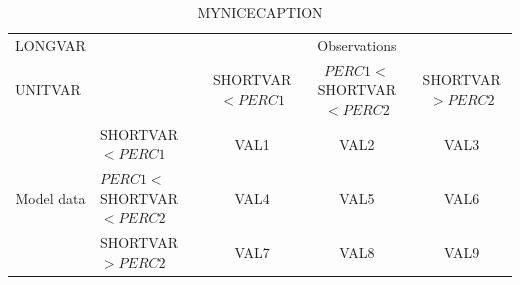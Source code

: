 
\begin{table}[p!]
\begin{center}
\begin{tabular}{llccc}
\hline
{LONGVAR}                                       &                                                    & \multicolumn{3}{c}{Observations}                 \\
{UNITVAR}                                       &                             & SHORTVAR$<PERC1$   & $PERC1<$SHORTVAR$<PERC2$ & SHORTVAR$>PERC2$ \\
\hline
\multicolumn{1}{c}{\multirow{3}{*}{Model data}}  & SHORTVAR$<PERC1$          & VAL1                & VAL2                       & VAL3              \\
                                                 & $PERC1<$SHORTVAR$<PERC2$ & VAL4                & VAL5                       & VAL6              \\
                                                 & SHORTVAR$>PERC2$          & VAL7                & VAL8                       & VAL9              \\
\hline
\end{tabular}
\end{center}
\caption{MYNICECAPTION}
\label{tab:contingencySHORTVAR}
\end{table}

